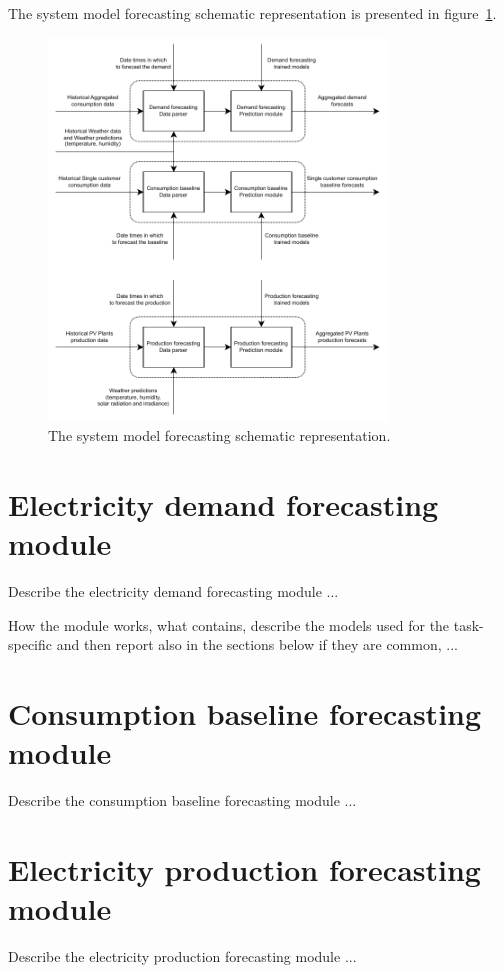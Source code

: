 The system model forecasting schematic representation is presented in figure~\ref{fig:modelforecasting}.

\begin{figure}[H]
\centering 
\includegraphics[width=0.8\textwidth]{images/system_model_forecasting}
\caption{The system model forecasting schematic representation.}
\label{fig:modelforecasting}
\end{figure}


\section{Electricity demand forecasting module}
\label{sec:demandmodel}
\vspace{0.2 cm}

Describe the electricity demand forecasting module ...

How the module works, what contains, describe the models used for the task-specific and then report also in the sections below if they are common, ...

\section{Consumption baseline forecasting module}
\label{sec:baselinemodel}
\vspace{0.2 cm}

Describe the consumption baseline forecasting module ...


\section{Electricity production forecasting module}
\label{sec:productionmodel}
\vspace{0.2 cm}

Describe the electricity production forecasting module ...
